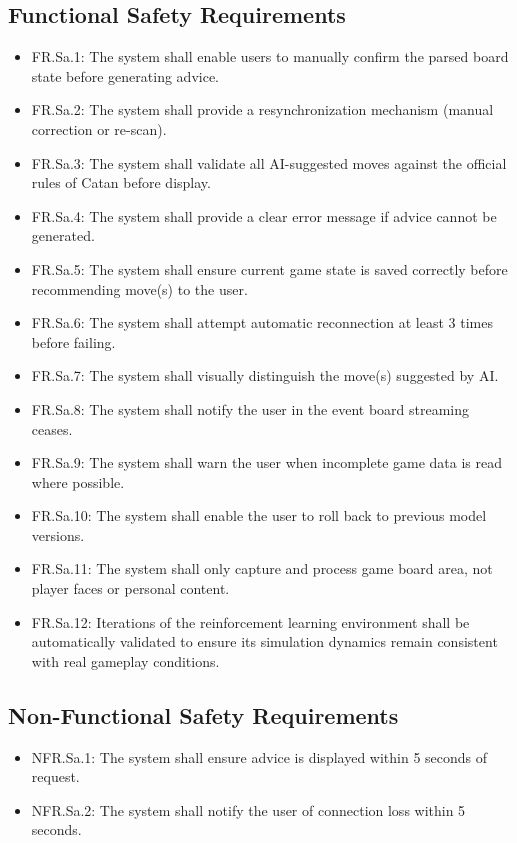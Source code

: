 \documentclass{article}
\begin{document}
\subsection{Functional Safety Requirements}\label{fr-sa}
\begin{itemize}
    \item FR.Sa.1: The system shall enable users to manually confirm the parsed board state before generating advice.
    \item FR.Sa.2: The system shall provide a resynchronization mechanism (manual correction or re-scan).
    \item FR.Sa.3: The system shall validate all AI-suggested moves against the official rules of Catan before display.
    \item FR.Sa.4: The system shall provide a clear error message if advice cannot be generated.
    \item FR.Sa.5: The system shall ensure current game state is saved correctly before recommending move(s) to the user.
    \item FR.Sa.6: The system shall attempt automatic reconnection at least 3 times before failing.
    \item FR.Sa.7: The system shall visually distinguish the move(s) suggested by AI.
    \item FR.Sa.8: The system shall notify the user in the event board streaming ceases.
    \item FR.Sa.9: The system shall warn the user when incomplete game data is read where possible.
    \item FR.Sa.10: The system shall enable the user to roll back to previous model versions.
    \item FR.Sa.11: The system shall only capture and process game board area, not player faces or personal content.
    \item FR.Sa.12: Iterations of the reinforcement learning environment shall be automatically validated to ensure its simulation dynamics remain consistent with real gameplay conditions. \newline
\end{itemize}

\subsection{Non-Functional Safety Requirements}\label{nfr-sa}
\begin{itemize}
    \item NFR.Sa.1: The system shall ensure advice is displayed within 5 seconds of request.
    \item NFR.Sa.2: The system shall notify the user of connection loss within 5 seconds.
\end{itemize}
\end{document}
